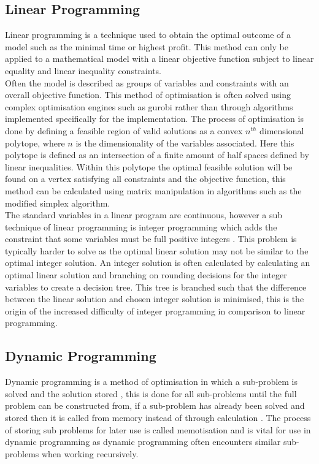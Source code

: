 \subsection{Linear Programming}
Linear programming is a technique used to obtain the optimal outcome of a model such as the minimal time or highest profit\cite{LPII}. This method can only be applied to a mathematical model with a linear objective function subject to linear equality and linear inequality constraints\cite{Intro2or}.\\ Often the model is described as groups of variables and constraints with an overall objective function. This method of optimisation is often solved using complex optimisation engines such as gurobi rather than through algorithms implemented specifically for the implementation. The process of optimisation is done by defining a feasible region of valid solutions as a convex $n^{th}$ dimensional polytope, where $n$ is the dimensionality of the variables associated\cite{oriNTRO}. Here this polytope is defined as an intersection of a finite amount of half spaces defined by linear inequalities. Within this polytope the optimal feasible solution will be found on a vertex satisfying all constraints and the objective function, this method can be calculated using matrix manipulation in algorithms such as the modified simplex algorithm\cite{LP}.  	
\\
The standard variables in a linear program are continuous, however a sub technique of linear programming is integer programming which adds the constraint that some variables must be full positive integers \cite{LPII}. This problem is typically harder to solve as the optimal linear solution may not be similar to the optimal integer solution\cite{Intro2or}. An integer solution is often calculated by calculating an optimal linear solution and branching on rounding decisions \cite{LPII} for the integer variables to create a decision tree. This tree is branched such that the difference between the linear solution and chosen integer solution is minimised, this is the origin of the increased difficulty of integer programming in comparison to linear programming\cite{oriNTRO}. 

\subsection{Dynamic Programming} 
Dynamic programming is a method of optimisation in which a sub-problem is solved and the solution stored \cite{Bellman}, this is done for all sub-problems until the full problem can be constructed from, if a sub-problem has already been solved and stored then it is called from memory instead of through calculation \cite{MITDynamic}. The process of storing sub problems for later use is called memotisation\cite{Bellman} and is vital for use in dynamic programming as dynamic programming often encounters similar sub-problems when working recursively\cite{MITDynamic}. \\

